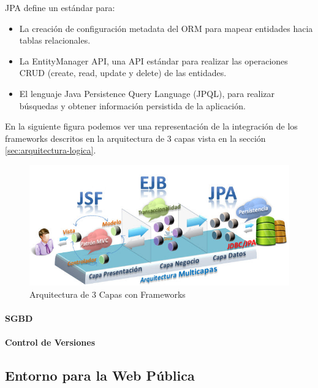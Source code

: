 \begin{itemize}
JPA define un estándar para:
\begin{itemize}
\item La creación de configuración metadata del ORM para mapear entidades hacia tablas relacionales.
\item La EntityManager API, una API estándar para realizar las operaciones CRUD (create, read, update y delete) de las entidades.
\item El lenguaje Java Persistence Query Language (JPQL), para realizar búsquedas y obtener información persistida de la aplicación.
\end {itemize}
\end {itemize}

En la siguiente figura podemos ver una representación de la integración de los frameworks descritos en la arquitectura de 3 capas vista en la sección \ref{sec:arquitectura-logica}.

\vspace{10mm}

\begin{figure}[H]
\centering
  \includegraphics[scale=.75]{img/arquitectura-jee.jpg}
  \caption{Arquitectura de 3 Capas con Frameworks}
  \label{fig:arquitectura-jee}
\end{figure}

\vspace{10mm}

\paragraph*{SGBD}

\paragraph*{Control de Versiones}



\subsection{Entorno para la Web Pública}


